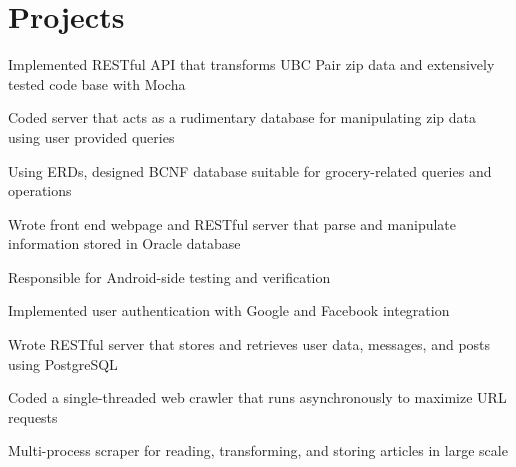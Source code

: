 \documentclass[]{deedy-resume-openfont}
\begin{document}
\section{Projects}

\begin{tightemize}
\item Implemented RESTful API that transforms UBC Pair zip data and extensively tested code base with Mocha
\item Coded server that acts as a rudimentary database for manipulating zip data using user provided queries
\end{tightemize}
\sectionsep

\begin{tightemize}
\item Using ERDs, designed BCNF database suitable for grocery-related queries and operations
\item Wrote front end webpage and RESTful server that parse and manipulate information stored in Oracle database
\end{tightemize}
\sectionsep

\begin{tightemize}
\item Responsible for Android-side testing and verification
\item Implemented user authentication with Google and Facebook integration
\item Wrote RESTful server that stores and retrieves user data, messages, and posts using PostgreSQL
\end{tightemize}
\sectionsep

\begin{tightemize}
\item Coded a single-threaded web crawler that runs asynchronously to maximize URL requests
\item Multi-process scraper for reading, transforming, and storing articles in large scale
\end{tightemize}
\sectionsep
\end{document}
